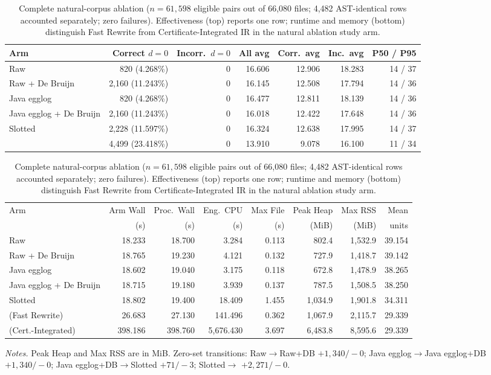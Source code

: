 \begin{table}[H]
\centering
\caption{Complete natural-corpus ablation ($n=61{,}598$ eligible pairs out of
66,080 files; 4,482 AST-identical rows accounted separately; zero failures).
Effectiveness (top) reports one \CanDis{} row; runtime and memory (bottom)
distinguish Fast Rewrite from Certificate-Integrated IR in the natural ablation
study arm.}
\label{tab:ablation-natural}
\scriptsize
\setlength{\tabcolsep}{2.8pt}
\begin{tabular}{@{}lrrrrrr@{}}
\toprule
Arm & Correct $d=0$ & Incorr.\ $d=0$ & All avg & Corr.\ avg & Inc.\ avg & P50 / P95\\
\midrule
Raw & 820 (4.268\%) & 0 & 16.606 & 12.906 & 18.283 & 14 / 37\\
Raw + De Bruijn & 2,160 (11.243\%) & 0 & 16.145 & 12.508 & 17.794 & 14 / 36\\
Java egglog & 820 (4.268\%) & 0 & 16.477 & 12.811 & 18.139 & 14 / 36\\
Java egglog + De Bruijn & 2,160 (11.243\%) & 0 & 16.018 & 12.422 & 17.648 & 14 / 36\\
Slotted & 2,228 (11.597\%) & 0 & 16.324 & 12.638 & 17.995 & 14 / 37\\
\CanDis{} & 4,499 (23.418\%) & 0 & 13.910 & 9.078 & 16.100 & 11 / 34\\
\bottomrule
\end{tabular}

\medskip
\setlength{\tabcolsep}{1.3pt}
\begin{tabular}{@{}lrrrrrrr@{}}
\toprule
Arm & Arm Wall & Proc.\ Wall & Eng.\ CPU & Max File & Peak Heap & Max RSS & Mean\\
& (s) & (s) & (s) & (s) & (MiB) & (MiB) & units\\
\midrule
Raw & 18.233 & 18.700 & 3.284 & 0.113 & 802.4 & 1,532.9 & 39.154\\
Raw + De Bruijn & 18.765 & 19.230 & 4.121 & 0.132 & 727.9 & 1,418.7 & 39.142\\
Java egglog & 18.602 & 19.040 & 3.175 & 0.118 & 672.8 & 1,478.9 & 38.265\\
Java egglog + De Bruijn & 18.715 & 19.180 & 3.939 & 0.137 & 787.5 & 1,508.5 & 38.250\\
Slotted & 18.802 & 19.400 & 18.409 & 1.455 & 1,034.9 & 1,901.8 & 34.311\\
\CanDis{} (Fast Rewrite) & 26.683 & 27.130 & 141.496 & 0.362 & 1,067.9 & 2,115.7 & 29.339\\
\CanDis{} (Cert.-Integrated) & 398.186 & 398.760 & 5,676.430 & 3.697 & 6,483.8 & 8,595.6 & 29.339\\
\bottomrule
\end{tabular}

\parbox{0.97\linewidth}{\footnotesize\emph{Notes.} Peak Heap and Max RSS are in
MiB. Zero-set transitions: Raw$\to$Raw+DB $+1{,}340/-0$;
Java egglog$\to$Java egglog+DB $+1{,}340/-0$;
Java egglog+DB$\to$Slotted $+71/-3$; Slotted$\to$\CanDis{} $+2{,}271/-0$.}
\end{table}
